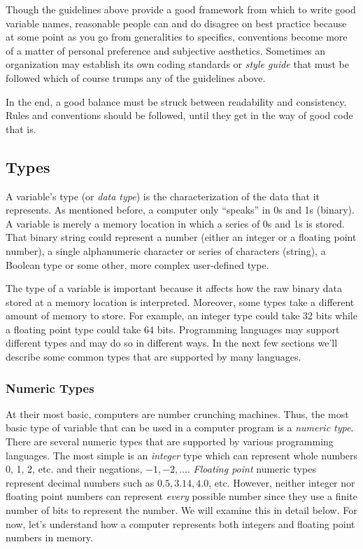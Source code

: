 Though the guidelines above provide a good framework from which to write good variable
names, reasonable people can and do disagree
on best practice because at some point as you go from generalities to specifics, conventions
become more of a matter of personal preference and subjective aesthetics.  Sometimes an
organization may establish its own coding standards or \emph{style guide}
 that must be followed which of course 
trumps any of the guidelines above.

In the end, a good balance must be struck between readability and consistency.  Rules and
conventions should be followed, until they get in the way of good code that is.

\subsection{Types}

A variable's \gls{type} (or \emph{data type}) is the characterization of the data that it 
represents.  As mentioned before, a computer only ``speaks'' in 0s and 1s (binary).  
A variable is merely a memory location in which a series of 0s and 1s is stored.  That
binary string could represent a number (either an integer or a floating point number), 
a single alphanumeric character or series of characters (string), a Boolean type or
some other, more complex user-defined type.  

The type of a variable is important because it affects 
how the raw binary data stored at a memory location is interpreted.  Moreover, some
types take a different amount of memory to store.  For example, an integer type could take
32 \glspl{bit} while a floating point type could take 64 \glspl{bit}.
Programming languages may support different types and may do so in different 
ways.
In the next few sections we'll describe some common types that are supported
by many languages.

\subsubsection{Numeric Types}

At their most basic, computers are number crunching machines.  Thus, the
most basic type of variable that can be used in a computer program is a
\emph{numeric type}.  There are several numeric types that are supported
by various programming languages.  The most simple is an \emph{integer}
type which can represent whole numbers 0, 1, 2, etc. and their negations, 
$-1, -2, \ldots$.  \emph{Floating point} numeric types represent decimal numbers
such as $0.5, 3.14, 4.0$, etc.  However, neither integer nor floating point numbers can
represent \emph{every} possible number since they use a finite
number of \glspl{bit} to represent the number.  We will examine this in
detail below.  For now, let's understand how a computer represents both
integers and floating point numbers in memory.

